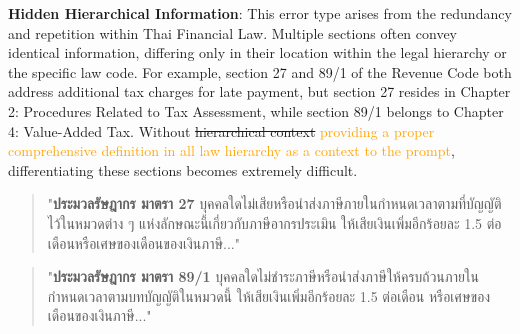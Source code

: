 \textbf{Hidden Hierarchical Information}: This error type arises from the redundancy and repetition within Thai Financial Law. Multiple sections often convey identical information, differing only in their location within the legal hierarchy or the specific law code. For example, section 27 and 89/1 of the Revenue Code both address additional tax charges for late payment, but section 27 resides in Chapter 2: Procedures Related to Tax Assessment, while section 89/1 belongs to Chapter 4: Value-Added Tax. Without \st{hierarchical context} \textcolor{orange}{providing a proper comprehensive definition in all law hierarchy as a context to the prompt}, differentiating these sections becomes extremely difficult.

\begin{quote}
\begin{thai}
"\textbf{ประมวลรัษฎากร มาตรา 27} บุคคลใดไม่เสียหรือนำส่งภาษีภายในกำหนดเวลาตามที่บัญญัติไว้ในหมวดต่าง ๆ แห่งลักษณะนี้เกี่ยวกับภาษีอากรประเมิน ให้เสียเงินเพิ่มอีกร้อยละ 1.5 ต่อเดือนหรือเศษของเดือนของเงินภาษี..."        
\end{thai}
\end{quote}

\begin{quote}
\begin{thai}
"\textbf{ประมวลรัษฎากร มาตรา 89/1} บุคคลใดไม่ชำระภาษีหรือนำส่งภาษีให้ครบถ้วนภายในกำหนดเวลาตามบทบัญญัติในหมวดนี้ ให้เสียเงินเพิ่มอีกร้อยละ 1.5 ต่อเดือน หรือเศษของเดือนของเงินภาษี..."           
\end{thai}
\end{quote}


